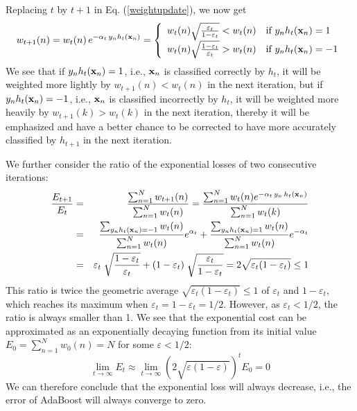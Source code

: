 \documentclass{article}
\begin{document}
Replacing $t$ by $t+1$ in Eq. (\ref{weightupdate}), we now get
\begin{equation}
  w_{t+1}(n)=w_t(n)\,e^{-\alpha_t\,y_nh_t({\bf x}_n)}
  =\left\{\begin{array}{ll} 
  w_t(n) \sqrt{\frac{\varepsilon_t}{1-\varepsilon_t}}<w_t(n) & 
  \mbox{if }y_n h_t({\bf x}_n)=1 \\
  w_t(n) \sqrt{\frac{1-\varepsilon_t}{\varepsilon_t}}>w_t(n) & 
  \mbox{if }y_n h_t({\bf x}_n)=-1 
  \end{array}\right.
\end{equation}
We see that if $y_nh_t({\bf x}_n)=1$, i.e., ${\bf x}_n$ is classified
correctly by $h_t$, it will be weighted more lightly by $w_{t+1}(n)<w_t(n)$
in the next iteration, but if $y_nh_t({\bf x}_n)=-1$, i.e., ${\bf x}_n$ 
is classified incorrectly by $h_t$, it will be weighted more heavily by 
$w_{t+1}(k)>w_t(k)$ in the next iteration, thereby it will be emphasized 
and have a better chance to be corrected to have more accurately 
classified by $h_{t+1}$ in the next iteration.

We further consider the ratio of the exponential losses of two 
consecutive iterations:
\begin{eqnarray}
  \frac{E_{t+1}}{E_t}&=&\frac{\sum_{n=1}^N w_{t+1}(n)}{\sum_{n=1}^N w_t(n)}
    =\frac{\sum_{n=1}^N w_t(n)e^{-\alpha_t\,y_n\,h_t({\bf x}_n)}}{\sum_{n=1}^N w_t(k)}
    \nonumber\\
    &=&\frac{\sum_{y_n h_t({\bf x}_n)=-1} w_t(n)}{\sum_{n=1}^N w_t(n)}e^{\alpha_t}
    +\frac{\sum_{y_n h_t({\bf x}_n)=1} w_t(n)}{\sum_{n=1}^N w_t(n)}e^{-\alpha_t}
    \nonumber\\
    &=&\varepsilon_t\;\sqrt{\frac{1-\varepsilon_t}{\varepsilon_t}}
    +(1-\varepsilon_t)\;\sqrt{\frac{\varepsilon_t}{1-\varepsilon_t}}
    =2\sqrt{\varepsilon_t(1-\varepsilon_t)}\le 1
\end{eqnarray}
This ratio is twice the geometric average 
$\sqrt{\varepsilon_t(1-\varepsilon_t)}\le 1$ of $\varepsilon_t$ 
and $1-\varepsilon_t$, which reaches its maximum when 
$\varepsilon_t=1-\varepsilon_t=1/2$. However, as $\varepsilon_t<1/2$, 
the ratio is always smaller than 1. We see that the exponential cost 
can be approximated as an exponentially decaying function from its
initial value $E_0=\sum_{n=1}^N w_0(n)=N$ for some $\varepsilon<1/2$:
\begin{equation}
  \lim_{t\rightarrow\infty}E_t\approx 
  \lim_{t\rightarrow\infty}\left(2\sqrt{\varepsilon(1-\varepsilon)}\right)^t E_0=0
\end{equation}
We can therefore conclude that the exponential loss will always decrease, 
i.e., the error of AdaBoost will always converge to zero. 
\end{document}
